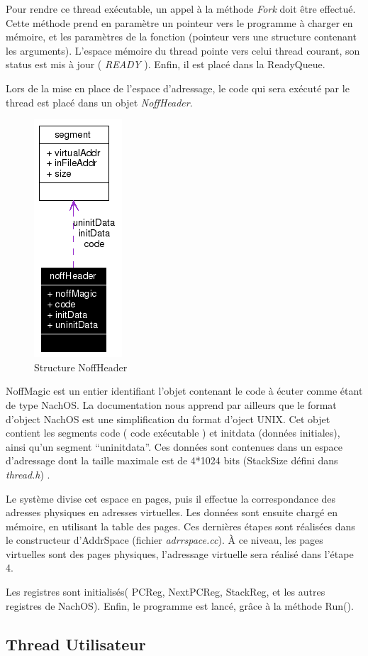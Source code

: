 \documentclass[a4paper,10pt]{article}
\begin{document}
Pour rendre ce thread exécutable, un appel à la méthode \textit{Fork} doit être effectué. Cette méthode prend en paramètre un pointeur vers le programme à charger en mémoire, et
les paramètres de la fonction (pointeur vers une structure contenant les arguments). L'espace mémoire du thread pointe vers celui thread courant, son status est mis à jour ( \textit{READY} ). Enfin, il est placé dans la ReadyQueue.

\newpage

Lors de la mise en place de l'espace d'adressage, le code qui sera exécuté par le thread est placé dans un objet \textit{NoffHeader}.

\begin{figure}[h]
  \begin{center}
    \includegraphics[scale=0.4]{./structnoff.png}
   \caption{\label{structnoff} Structure NoffHeader}
  \end{center}
\end{figure}

NoffMagic est un entier identifiant l'objet contenant le code à écuter comme étant de type NachOS.
La documentation nous apprend par ailleurs que le format d'object NachOS est une simplification du format d'oject UNIX.
Cet objet contient les segments code ( code exécutable ) et initdata (données initiales), ainsi qu'un segment ``uninitdata''.
Ces données sont contenues dans un espace d'adressage dont la taille maximale est de 4*1024 bits (StackSize défini dans \textit{thread.h}) .
\vspace{0.5cm}

Le système divise cet espace en pages, puis il effectue la correspondance des adresses physiques en adresses virtuelles.
Les données sont ensuite chargé en mémoire, en utilisant la table des pages. Ces dernières étapes sont réalisées dans le constructeur d'AddrSpace (fichier \textit{adrrspace.cc}).
À ce niveau, les pages virtuelles sont des pages physiques,
l'adressage virtuelle sera réalisé dans l'étape 4.

\vspace{0.5cm}

Les registres sont initialisés( PCReg, NextPCReg, StackReg, et les autres registres de NachOS).
Enfin, le programme est lancé, grâce à la méthode Run().




\subsection{Thread Utilisateur}
\end{document}
